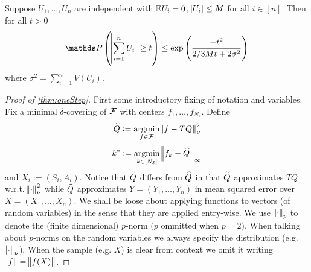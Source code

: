 \begin{thm}
  Suppose $U_1, \dots, U_n$ are independent with $\mathbb{E} U_i = 0$, $\abs{U_i} \leq M$
  for all $i \in [n]$. Then for all $t>0$
  \[ \Prob\left(\abs{\sum_{i=1}^n U_i} \geq t\right) \leq
  \exp\left( \frac{-t^2}{2/3 M t + 2 \sigma^2} \right) \]
  where $\sigma^2 = \sum_{i=1}^n V(U_i)$.
  \label{thm:Bernstein}
\end{thm}

\begin{proof}[Proof of \cref{thm:oneStep}]
  First some introductory fixing of notation and variables.
  Fix a minimal $\delta$-covering of $\mathcal{F}$
  with centers $f_1, \dots, f_{N_\delta}$.
  Define
  \[ \widetilde{Q} := \operatorname*{argmin}_{f \in \mathcal{F}} \norm{f - TQ}_{\nu}^2 \]
  \[ k^* := \operatorname*{argmin}_{k \in [N_\delta]} \norm{f_k - \widehat{Q}}_\infty \]
  and $ X_i := (S_i, A_i) $.
  Notice that $\widetilde{Q}$ differs from $\widehat{Q}$ in that
  $\widetilde{Q}$ approximates $TQ$ w.r.t. $\norm{\cdot}^2_\nu$ while
  $\widehat{Q}$ approximates $Y = (Y_1, \dots, Y_n)$ in mean squared error over
  $X = (X_1, \dots, X_n)$.
  We shall be loose about applying functions to vectors
  (of random variables)
  in the sense that they are applied entry-wise.
  We use $\norm{\cdot}_p$ to denote the (finite dimensional) $p$-norm
  ($p$ ommitted when $p=2$).
  When talking about $p$-norms on the random variables we always specify
  the distribution (e.g. $\norm{\cdot}_\nu$).
  When the sample (e.g. $X$) is clear from context we omit it writing
  $\norm{f} = \norm{f(X)}$.
  

\end{proof}
